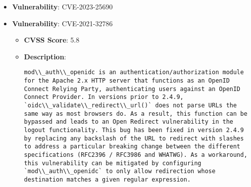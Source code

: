 \documentclass{article}
\begin{document}
\begin{itemize}
        \item \textbf{Vulnerability}: CVE-2023-25690
    
        \item \textbf{Vulnerability}: CVE-2021-32786
        \begin{itemize}
            \item \textbf{CVSS Score}:  5.8 
            \item \textbf{Description}:
            \parbox[t]{0.9\linewidth}{
                \verb|mod\\_auth\\_openidc is an authentication/authorization module for the Apache 2.x HTTP server that functions as an OpenID Connect Relying Party, authenticating users against an OpenID Connect Provider. In versions prior to 2.4.9, `oidc\\_validate\\_redirect\\_url()` does not parse URLs the same way as most browsers do. As a result, this function can be bypassed and leads to an Open Redirect vulnerability in the logout functionality. This bug has been fixed in version 2.4.9 by replacing any backslash of the URL to redirect with slashes to address a particular breaking change between the different specifications (RFC2396 / RFC3986 and WHATWG). As a workaround, this vulnerability can be mitigated by configuring `mod\\_auth\\_openidc` to only allow redirection whose destination matches a given regular expression.|
            }
        \end{itemize}
    

\end{itemize}
\end{document}
